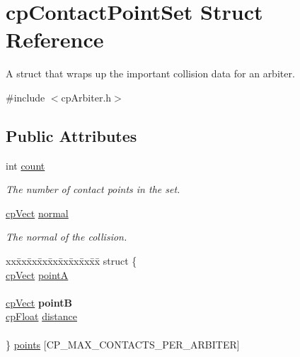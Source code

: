 \hypertarget{structcp_contact_point_set}{}\section{cp\+Contact\+Point\+Set Struct Reference}
\label{structcp_contact_point_set}


A struct that wraps up the important collision data for an arbiter.  




{\ttfamily \#include $<$cp\+Arbiter.\+h$>$}

\subsection*{Public Attributes}
\begin{DoxyCompactItemize}
\item 
\hypertarget{structcp_contact_point_set_a06dadd34b06a8c7f00def95ca6a1ff88}{}int \hyperlink{structcp_contact_point_set_a06dadd34b06a8c7f00def95ca6a1ff88}{count}\label{structcp_contact_point_set_a06dadd34b06a8c7f00def95ca6a1ff88}

\begin{DoxyCompactList}\small\item\em The number of contact points in the set. \end{DoxyCompactList}\item 
\hypertarget{structcp_contact_point_set_a2fab2c7e343e14833185b2c97e9fd5b8}{}\hyperlink{structcp_vect}{cp\+Vect} \hyperlink{structcp_contact_point_set_a2fab2c7e343e14833185b2c97e9fd5b8}{normal}\label{structcp_contact_point_set_a2fab2c7e343e14833185b2c97e9fd5b8}

\begin{DoxyCompactList}\small\item\em The normal of the collision. \end{DoxyCompactList}\item 
\hypertarget{structcp_contact_point_set_aa9532c79695d344cc5fd8bed8cc1374e}{}\begin{tabbing}
xx\=xx\=xx\=xx\=xx\=xx\=xx\=xx\=xx\=\kill
struct \{\\
\>\hyperlink{structcp_vect}{cpVect} \hyperlink{structcp_contact_point_set_a9d7ac05d747afa63699e89ea6dba62c2}{pointA}\\
\>\\
\>\hyperlink{structcp_vect}{cpVect} {\bfseries pointB}\\
\>\hyperlink{group__basic_types_gac1ed65573e035bf892505768c852d8d3}{cpFloat} \hyperlink{structcp_contact_point_set_ad8581bff488e9f44ef899f75e044bc6c}{distance}\\
\>\\
\} \hyperlink{structcp_contact_point_set_aa9532c79695d344cc5fd8bed8cc1374e}{points} \mbox{[}CP\_MAX\_CONTACTS\_PER\_ARBITER\mbox{]}\label{structcp_contact_point_set_aa9532c79695d344cc5fd8bed8cc1374e}
\\


\end{tabbing}
\end{DoxyCompactItemize}
